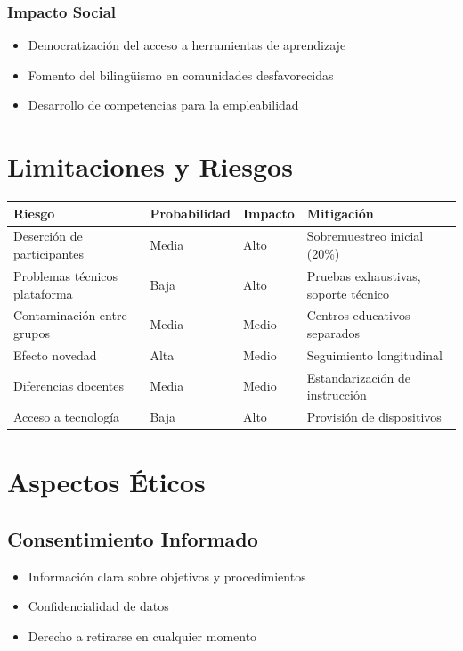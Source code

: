 \documentclass[12pt,a4paper]{article}
\begin{document}
\subsubsection{Impacto Social}
\begin{itemize}
    \item Democratización del acceso a herramientas de aprendizaje
    \item Fomento del bilingüismo en comunidades desfavorecidas
    \item Desarrollo de competencias para la empleabilidad
\end{itemize}

\section{Limitaciones y Riesgos}

\begin{table}[H]
\centering
\begin{tabular}{|l|l|l|l|}
\hline
\textbf{Riesgo} & \textbf{Probabilidad} & \textbf{Impacto} & \textbf{Mitigación} \\
\hline
Deserción de participantes & Media & Alto & Sobremuestreo inicial (20\%) \\
Problemas técnicos plataforma & Baja & Alto & Pruebas exhaustivas, soporte técnico \\
Contaminación entre grupos & Media & Medio & Centros educativos separados \\
Efecto novedad & Alta & Medio & Seguimiento longitudinal \\
Diferencias docentes & Media & Medio & Estandarización de instrucción \\
Acceso a tecnología & Baja & Alto & Provisión de dispositivos \\
\hline
\end{tabular}
\end{table}

\section{Aspectos Éticos}

\subsection{Consentimiento Informado}
\begin{itemize}
    \item Información clara sobre objetivos y procedimientos
    \item Confidencialidad de datos
    \item Derecho a retirarse en cualquier momento
\end{itemize}
\end{document}
